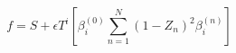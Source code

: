 \begin{equation} 
f = S + \epsilon T^{i} \left[ \beta^{(0)}_{i} \sum_{n=1}^{N} 
                              (1 - Z_{n})^{2} \beta^{(n)}_{i} \right]
\end{equation}

